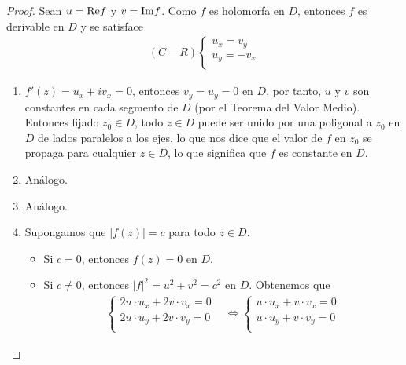 \begin{proof}
    Sean $u = \text{Re} f$ y $v = \text{Im} f$. Como $f$ es holomorfa en $D$, entonces $f$ es derivable en $D$ y se satisface
    \begin{align*}
        (C-R) \left\{ \begin{array}{lcc}
                          u_x = v_y  \\
                          u_y = -v_x \\
                      \end{array}
        \right.
    \end{align*}
    \begin{enumerate}
        \item $f'(z) = u_x + iv_x = 0$, entonces $v_y = u_y = 0$ en $D$, por tanto, $u$ y $v$ son constantes en cada segmento de $D$ (por el Teorema del Valor Medio). Entonces fijado $z_0 \in D$, todo $z \in D$ puede ser unido por una poligonal a $z_0$ en $D$ de lados paralelos a los ejes, lo que nos dice que el valor de $f$ en $z_0$ se propaga para cualquier $z \in D$, lo que significa que $f$ es constante en $D$.
        \item Análogo.
        \item Análogo.
        \item Supongamos que $|f(z)| = c$ para todo $z \in D$.
              \begin{itemize}
                  \item Si $c = 0$, entonces $f(z) = 0$ en $D$.
                  \item Si $c \not = 0$, entonces $|f|^2 = u^2 + v^2 = c^2$ en $D$. Obtenemos que
                        \begin{align*}
                            \left\{ \begin{array}{lcc}
                                        2u \cdot u_x + 2v \cdot v_x = 0 \\
                                        2u \cdot u_y + 2v \cdot v_y = 0 \\
                                    \end{array}
                            \right. & \Longleftrightarrow \left\{ \begin{array}{lcc}
                                                                      u \cdot u_x + v \cdot v_x = 0 \\
                                                                      u \cdot u_y + v \cdot v_y = 0 \\
                                                                  \end{array}

\end{align*}
\end{itemize}
\end{enumerate}
\end{proof}
